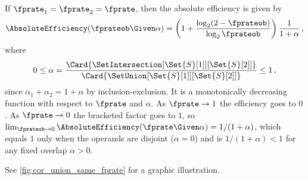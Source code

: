 \documentclass[ ../main.tex]{subfiles}
\begin{document}
\begin{corollary}
If $\fprate_1 = \fprate_2 = \fprate$, then the absolute efficiency is given by
\begin{equation}
\AbsoluteEfficiency(\fprateob \Given \alpha) = \left(1 + \frac{\log_2(2 - \fprateob)}{\log_2 \fprateob}\right)\frac{1}{1 + \alpha}\,,
\end{equation}
where
\begin{equation}
    0 \leq \alpha = \frac{\Card{\SetIntersection[\Set{S}[1]][\Set{S}[2]]}}{\Card{\SetUnion[\Set{S}[1]][\Set{S}[2]]}} \leq 1\,,
\end{equation}
since $\alpha_1 + \alpha_2 = 1 + \alpha$ by inclusion-exclusion. It is a
monotonically decreasing function with respect to $\fprate$ and $\alpha$. As
$\fprate \to 1$ the efficiency goes to $0$. As $\fprate \to 0$ the bracketed
factor goes to $1$, so $\lim_{\fprateob \to 0} \AbsoluteEfficiency(\fprate \Given
\alpha) = 1/(1 + \alpha)$, which equals $1$ only when the operands are disjoint
($\alpha = 0$) and is $1/(1+\alpha) < 1$ for any fixed overlap $\alpha > 0$.
\end{corollary}
See \cref{fig:cor_union_same_fprate} for a graphic illustration.
\end{document}

